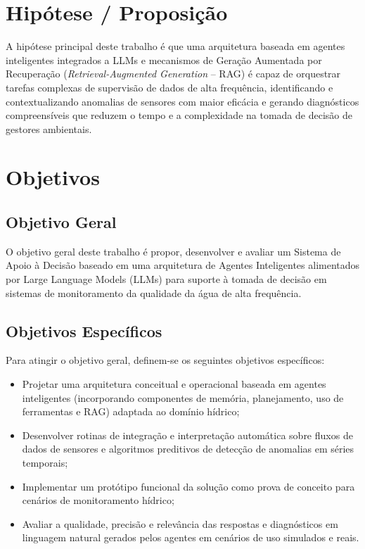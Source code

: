 \section{Hipótese / Proposição}

A hipótese principal deste trabalho é que uma arquitetura baseada em agentes inteligentes integrados a LLMs e mecanismos de Geração Aumentada por Recuperação (\textit{Retrieval-Augmented Generation} -- RAG) é capaz de orquestrar tarefas complexas de supervisão de dados de alta frequência, identificando e contextualizando anomalias de sensores com maior eficácia e gerando diagnósticos compreensíveis que reduzem o tempo e a complexidade na tomada de decisão de gestores ambientais.

\section{Objetivos}

\subsection{Objetivo Geral}
O objetivo geral deste trabalho é propor, desenvolver e avaliar um Sistema de Apoio à Decisão baseado em uma arquitetura de Agentes Inteligentes alimentados por Large Language Models (LLMs) para suporte à tomada de decisão em sistemas de monitoramento da qualidade da água de alta frequência.

\subsection{Objetivos Específicos}
Para atingir o objetivo geral, definem-se os seguintes objetivos específicos:
\begin{itemize}
    \item Projetar uma arquitetura conceitual e operacional baseada em agentes inteligentes (incorporando componentes de memória, planejamento, uso de ferramentas e RAG) adaptada ao domínio hídrico;
    \item Desenvolver rotinas de integração e interpretação automática sobre fluxos de dados de sensores e algoritmos preditivos de detecção de anomalias em séries temporais;
    \item Implementar um protótipo funcional da solução como prova de conceito para cenários de monitoramento hídrico;
    \item Avaliar a qualidade, precisão e relevância das respostas e diagnósticos em linguagem natural gerados pelos agentes em cenários de uso simulados e reais.
\end{itemize}

